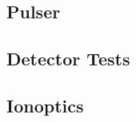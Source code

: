 	\subsection{Pulser}
	
	
	
	
	\subsection{Detector Tests}
	
	
	\subsection{Ionoptics}
	
	
	
	
	
	
	
	
	